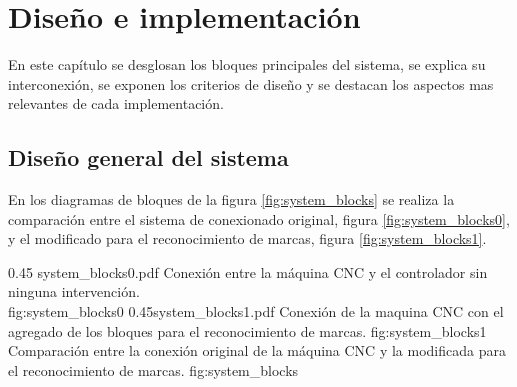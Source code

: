 \chapter{Diseño e implementación} %

\label{Chapter3}

En este capítulo se desglosan los bloques principales del sistema, se explica su interconexión, se exponen los criterios de diseño y se destacan los aspectos mas relevantes de cada implementación.

\section{Diseño general del sistema}

En los diagramas de bloques de la figura \ref{fig:system_blocks} se realiza la comparación entre el sistema de conexionado original, figura \ref{fig:system_blocks0}, y el modificado para el reconocimiento de marcas, figura \ref{fig:system_blocks1}.

\subfigab 
{0.45} {system_blocks0.pdf} {Conexión entre la máquina CNC y el controlador sin ninguna intervención.\\ \vphantom{1}} {fig:system_blocks0}
        {0.45}{system_blocks1.pdf} {Conexión de la maquina CNC con el agregado de los bloques para el reconocimiento de marcas.} {fig:system_blocks1}
        {Comparación entre la conexión original de la máquina CNC y la modificada para el reconocimiento de marcas.}
        {fig:system_blocks}

